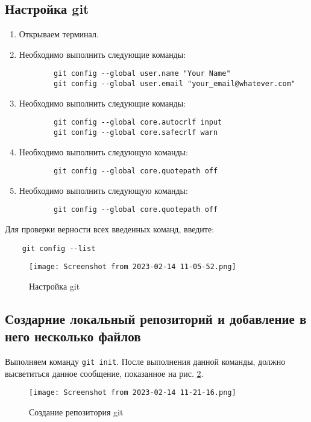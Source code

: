 \subsection{Настройка git}
\begin{enumerate}
	\item Открываем терминал.
	\item Необходимо выполнить следующие команды:
	\begin{verbatim}
		git config --global user.name "Your Name"
		git config --global user.email "your_email@whatever.com"
	\end{verbatim}
	\item Необходимо выполнить следующие команды:
	\begin{verbatim}
		git config --global core.autocrlf input
		git config --global core.safecrlf warn
	\end{verbatim}
	\item Необходимо выполнить следующую команды:
	\begin{verbatim}
		git config --global core.quotepath off
	\end{verbatim}
	\item Необходимо выполнить следующую команды:
	\begin{verbatim}
		git config --global core.quotepath off
	\end{verbatim}
\end{enumerate}
Для проверки верности всех введенных команд, введите:
\begin{verbatim}
	git config --list
\end{verbatim}
\begin{figure}[hp]
	\centering
	\texttt{[image: Screenshot from 2023-02-14 11-05-52.png]}
	\caption{Настройка git}
	\label{fig:git:config}
\end{figure}

\subsection{Создарние локальный репозиторий и добавление в него несколько файлов}
Выполняем команду \texttt{git init}.
После выполнения данной команды, должно высветиться данное сообщение, показанное на рис. \ref{fig:git:init}.
\begin{figure}[hp]
	\centering
	\texttt{[image: Screenshot from 2023-02-14 11-21-16.png]}
	\caption{Создание репозитория git}
	\label{fig:git:init}
\end{figure}

